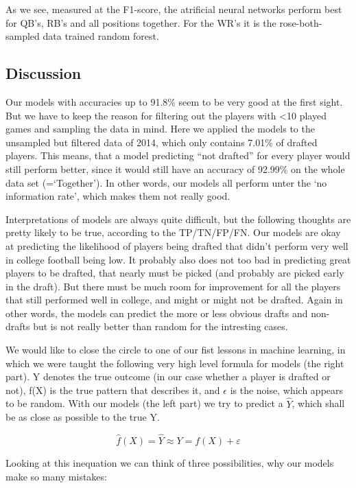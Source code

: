 \documentclass[]{article}
\begin{document}
As we see, measured at the F1-score, the atrificial neural networks
perform best for QB's, RB's and all positions together. For the WR's it
is the rose-both-sampled data trained random forest.

\hypertarget{discussion}{%
\subsection{Discussion}\label{discussion}}

Our models with accuracies up to 91.8\% seem to be very good at the
first sight. But we have to keep the reason for filtering out the
players with \textless10 played games and sampling the data in mind.
Here we applied the models to the unsampled but filtered data of 2014,
which only contains 7.01\% of drafted players. This means, that a model
predicting ``not drafted'' for every player would still perform better,
since it would still have an accuracy of 92.99\% on the whole data set
(=`Together'). In other words, our models all perform unter the `no
information rate', which makes them not really good.

Interpretations of models are always quite difficult, but the following
thoughts are pretty likely to be true, according to the TP/TN/FP/FN. Our
models are okay at predicting the likelihood of players being drafted
that didn't perform very well in college football being low. It probably
also does not too bad in predicting great players to be drafted, that
nearly must be picked (and probably are picked early in the draft). But
there must be much room for improvement for all the players that still
performed well in college, and might or might not be drafted. Again in
other words, the models can predict the more or less obvious drafts and
non-drafts but is not really better than random for the intresting
cases.

We would like to close the circle to one of our fist lessons in machine
learning, in which we were taught the following very high level formula
for models (the right part). Y denotes the true outcome (in our case
whether a player is drafted or not), f(X) is the true pattern that
describes it, and \(\epsilon\) is the noise, which appears to be random.
With our models (the left part) we try to predict a \(\hat{Y}\), which
shall be as close as possible to the true Y.

\[\hat{f}(X) = \hat{Y} \approx Y = f(X) + \varepsilon\]

Looking at this inequation we can think of three possibilities, why our
models make so many mistakes:
\end{document}
